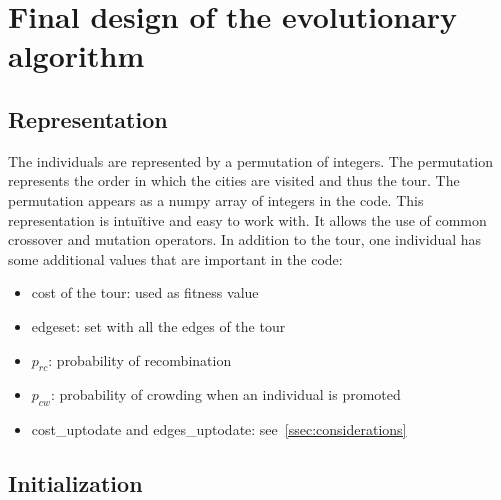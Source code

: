 \documentclass[a4paper,10pt]{article}
\newcommand{\ReplaceMe}[1]{{\color{blue}#1}}
\newcommand{\RemoveMe}[1]{{\color{purple}#1}}
\begin{document}
\section{Final design of the evolutionary algorithm}\label{sec:design} 



\subsection{Representation}\label{ssec:representation}

The individuals are represented by a permutation of integers. The permutation represents the order in which the cities are visited and thus the tour. The permutation appears as a numpy array of integers in the code. This representation is intu\"itive and easy to work with. It allows the use of common crossover and mutation operators. In addition to the tour, one individual has some additional values that are important in the code:
\begin{itemize}
  \item cost of the tour: used as fitness value
  \item edgeset: set with all the edges of the tour
  \item $p_{rc}$: probability of recombination
  \item $p_{cw}$: probability of crowding when an individual is promoted
  \item cost\_uptodate and edges\_uptodate: see~\ref{ssec:considerations}  
\end{itemize}

\subsection{Initialization}\label{ssec:initialization}
\end{document}
